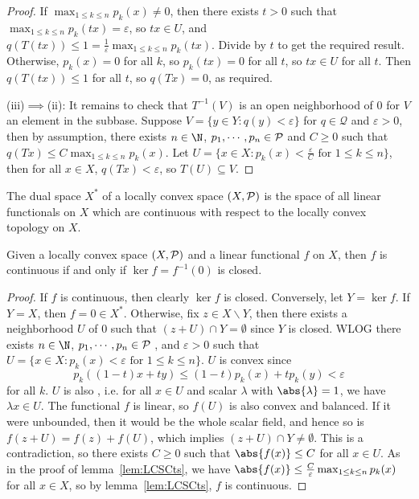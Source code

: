 \documentclass[a4paper]{article}
\begin{document}
{\begin{proof}
  If $\max_{1\leq k\leq n}p_k(x)\not= 0$, then there exists $t>0$ such that $\max_{1\leq k\leq n}p_k(tx)=\varepsilon$, so $tx\in U$, and $q(T(tx))\leq 1=\frac{1}{\varepsilon}\max_{1\leq k\leq n}p_k(tx)$. Divide by $t$ to get the required result. Otherwise, $p_k(x)=0$ for all $k$, so $p_k(tx)=0$ for all $t$, so $tx\in U$ for all $t$. Then $q(T(tx))\leq 1$ for all $t$, so $q(Tx)=0$, as required.

  (iii)$\implies$(ii): It remains to check that $T^{-1}(V)$ is an open neighborhood of 0 for $V$ an element in the subbase. Suppose $V=\{y\in Y:q(y)<\varepsilon\}$ for $q\in\mathcal{Q}$ and $\varepsilon>0$, then by assumption, there exists $n\in\N$, $p_1,\cdots,p_n\in\P$ and $C\geq 0$ such that $q(Tx)\leq C\max_{1\leq k\leq n}p_k(x)$. Let $U=\{x\in X:p_k(x)<\frac{\varepsilon}{C}\text{ for }1\leq k\leq n\}$, then for all $x\in X$, $q(Tx)<\varepsilon$, so $T(U)\subseteq V$.
\end{proof}

The dual space $X^*$ of a locally convex space $(X,\P)$ is the space of all linear functionals on $X$ which are continuous with respect to the locally convex topology on $X$.

\begin{ncor}\label{cor:KernelClosed}
  Given a locally convex space $(X,\P)$ and a linear functional $f$ on $X$, then $f$ is continuous if and only if $\ker f=f^{-1}(0)$ is closed.
\end{ncor}

\begin{proof}
	If $f$ is continuous, then clearly $\ker f$ is closed. Conversely, let $Y=\ker f$. If $Y=X$, then $f=0\in X^*$. Otherwise, fix $z\in X\backslash Y$, then there exists a neighborhood $U$ of 0 such that $(z+U)\cap Y=\emptyset$ since $Y$ is closed. WLOG there exists $n\in\N$, $p_1,\cdots,p_n\in\P$ , and $\varepsilon>0$ such that $U=\{x\in X:p_k(x)<\varepsilon\text{ for }1\leq k\leq n\}$. $U$ is convex since
	\[
	 p_k((1-t)x+ty)\leq (1-t)p_k(x)+tp_k(y)<\varepsilon
	\]
	for all $k$. $U$ is also , i.e. for all $x\in U$ and scalar $\lambda$ with $\abs{\lambda}=1$, we have $\lambda x\in U$. The functional $f$ is linear, so $f(U)$ is also convex and balanced. If it were unbounded, then it would be the whole scalar field, and hence so is $f(z+U)=f(z)+f(U)$, which implies $(z+U)\cap Y\not=\emptyset$. This is a contradiction, so there exists $C\geq 0$ such that $\abs{f(x)}\leq C$ for all $x\in U$. As in the proof of lemma~\ref{lem:LCSCts}, we have $\abs{f(x)}\leq\frac{C}{\varepsilon}\max_{1\leq k\leq n}p_k(x)$ for all $x\in X$, so by lemma~\ref{lem:LCSCts}, $f$ is continuous.
\end{proof}

}
\end{document}
